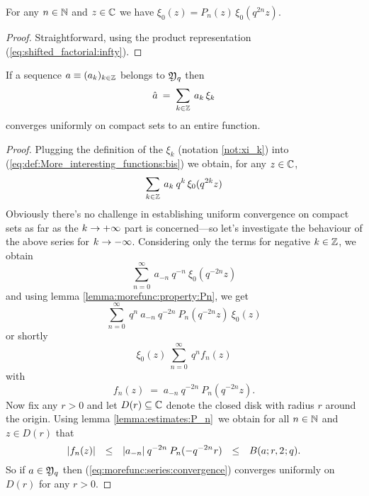 \begin{lemma} \label{lemma:morefunc:property:Pn}
For any\/ $n\in\mathbb{N}$ and\/ $z\in\mathbb{C}$ we have\/ $\xi_0(z) = P_n(z) \, \xi_0(q^{2n} z)$.
\end{lemma}
\begin{proof}
Straightforward, using the product representation (\ref{eq:shifted_factorial:infty}).
\end{proof}




\begin{lemma}  \label{lemma:More_interesting_functions:entire}
If a sequence\/ $a\equiv (a_k)_{k\in \mathbb{Z}}$ belongs to\/ ${\mathfrak Y}_q$ then
\begin{equation} \label{eq:def:More_interesting_functions:bis}
   \hat{a} \:=\; \sum_{k \in \mathbb{Z}} \: a_k \,\xi_k
\end{equation}
converges uniformly on compact sets to an entire function.
\end{lemma}

\begin{proof}
Plugging the definition of the $\xi_k$ (notation \ref{not:xi_k})
into (\ref{eq:def:More_interesting_functions:bis}) we obtain, for any $z\in\mathbb{C}$,
\begin{equation} \label{eq:morefunc:series:xi_0}
   \sum_{k \in \mathbb{Z}} \: a_k \: q^k \, \xi_0(q^{2k} z)
\end{equation}
Obviously there's no challenge in establishing uniform convergence on compact sets
as far as the $k \rightarrow +\infty$ part is concerned---so let's investigate the
behaviour of the above series for $k \rightarrow -\infty$.
Considering only the terms for negative $k\in\mathbb{Z}$, we obtain
$$  \sum_{n=0}^\infty \: a_{-n} \: q^{-n} \: \xi_0(q^{-2n} z) $$
and using lemma \ref{lemma:morefunc:property:Pn}, we get
$$  \sum_{n=0}^\infty \: q^n \: a_{-n} \: q^{-2n} \: P_n (q^{-2n} z) \: \xi_0(z) $$
or shortly
\begin{equation}\label{eq:morefunc:series:convergence}
   \xi_0(z) \:   \sum_{n=0}^\infty   \: q^n  f_n (z)
\end{equation}
with
$$  f_n(z) \;=\; a_{-n} \: q^{-2n} \: P_n (q^{-2n} z). $$
Now fix any $r>0$ and let $D(r) \subseteq \mathbb{C}$ denote the closed disk with radius $r$
around the origin.
Using lemma \ref{lemma:estimates:P_n}\ we obtain for all $n \in \mathbb{N}$ and $z\in D(r)$ that
$$  |f_n(z)|
\hspace {0.7em} \leq \hspace {0.7em}
    |a_{-n}| \: q^{-2n} \: P_n (- q^{-2n} \hspace{.5pt} r)
\hspace {0.7em} \leq \hspace {0.7em}
    B(a; r, 2 \hspace{.5pt} ; q). $$
So if $a \in {\mathfrak Y}_q$ then (\ref{eq:morefunc:series:convergence}) converges
uniformly on $D(r)$ for any $r>0$.
\end{proof}


